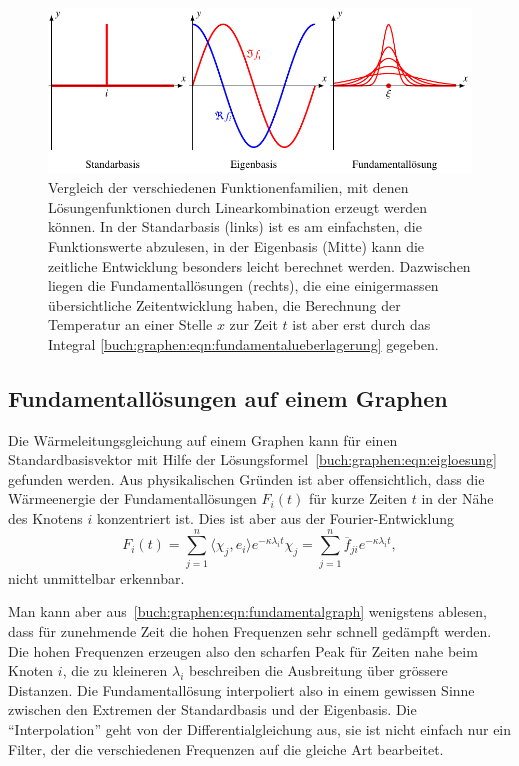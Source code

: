\begin{figure}
\centering
\includegraphics{chapters/70-graphen/images/fundamental.pdf}
\caption{Vergleich der verschiedenen Funktionenfamilien, mit denen
Lösungenfunktionen durch Linearkombination erzeugt werden können.
In der Standarbasis (links) ist es am einfachsten, die Funktionswerte
abzulesen, in der Eigenbasis (Mitte) kann die zeitliche Entwicklung
besonders leicht berechnet werden.
Dazwischen liegen die Fundamentallösungen (rechts), die eine einigermassen
übersichtliche Zeitentwicklung haben, die Berechnung der Temperatur an 
einer Stelle $x$ zur Zeit $t$ ist aber erst durch das Integral
\eqref{buch:graphen:eqn:fundamentalueberlagerung} gegeben.
\label{buch:graphen:fig:fundamental}}
\end{figure}

\subsection{Fundamentallösungen auf einem Graphen}
Die Wärmeleitungsgleichung auf einem Graphen kann für einen
Standardbasisvektor mit Hilfe der
Lösungsformel~\eqref{buch:graphen:eqn:eigloesung}
gefunden werden.
Aus physikalischen Gründen ist aber offensichtlich, dass die
Wärmeenergie der Fundamentallösungen $F_i(t)$ für kurze Zeiten $t$
in der Nähe des Knotens $i$ konzentriert ist.
Dies ist aber aus der Fourier-Entwicklung
\begin{equation}
F_i(t)
=
\sum_{j=1}^n \langle \chi_j,e_i\rangle e^{-\kappa \lambda_i t} \chi_j
=
\sum_{j=1}^n \overline{f}_{ji} e^{-\kappa \lambda_i t},
\label{buch:graphen:eqn:fundamentalgraph}
\end{equation}
nicht unmittelbar erkennbar.

Man kann aber aus~\eqref{buch:graphen:eqn:fundamentalgraph}
wenigstens ablesen,
dass für zunehmende Zeit die hohen Frequenzen sehr schnell gedämpft
werden.
Die hohen Frequenzen erzeugen also den scharfen Peak für Zeiten nahe
beim Knoten $i$, die zu kleineren $\lambda_i$ beschreiben die Ausbreitung
über grössere Distanzen.
Die Fundamentallösung interpoliert also in einem gewissen Sinne zwischen
den Extremen der Standardbasis und der Eigenbasis.
Die ``Interpolation'' geht von der Differentialgleichung aus,
sie ist nicht einfach nur ein Filter, der die verschiedenen Frequenzen
auf die gleiche Art bearbeitet.

